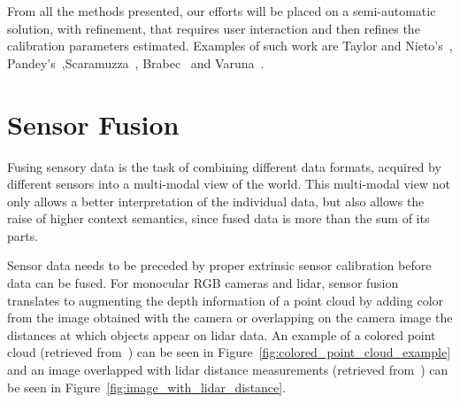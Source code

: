 From all the methods presented, our efforts will be placed on a semi-automatic solution, with refinement, that requires user interaction and then refines the calibration parameters estimated. Examples of such work are Taylor and Nieto's~\cite{Taylor2013}, Pandey's~\cite{Pandey2012},Scaramuzza~\cite{Scaramuzza}, Brabec~\cite{brabec2014} and Varuna~\cite{DeSilva2018}.


\section{Sensor Fusion}
\label{sec:sota:sensor-fusion}
Fusing sensory data is the task of combining different data formats, acquired by different sensors into a multi-modal view of the world. This multi-modal view not only allows a better interpretation of the individual data, but also allows the raise of higher context semantics, since fused data is more than the sum of its parts.

Sensor data needs to be preceded by proper extrinsic sensor calibration before data can be fused. For monocular RGB cameras and \ac{lidar}, sensor fusion translates to augmenting the depth information of a point cloud by adding color from the image obtained with the camera or overlapping on the camera image the distances at which objects appear on \ac{lidar} data. An example of a colored point cloud (retrieved from~\cite{Gong2013}) can be seen in Figure~\ref{fig:colored_point_cloud_example} and an image overlapped with \ac{lidar} distance measurements (retrieved from~\cite{Bileschi2009}) can be seen in Figure~\ref{fig:image_with_lidar_distance}.

